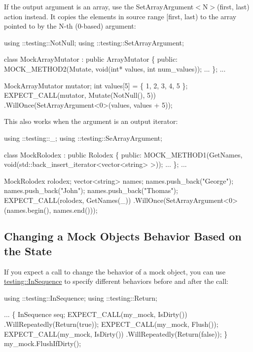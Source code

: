 If the output argument is an array, use the {\ttfamily Set\+Array\+Argument$<$N$>$(first, last)} action instead. It copies the elements in source range {\ttfamily \mbox{[}first, last)} to the array pointed to by the {\ttfamily N}-\/th (0-\/based) argument\+:


\begin{DoxyCode}
using ::testing::NotNull;
using ::testing::SetArrayArgument;

class MockArrayMutator : public ArrayMutator \{
 public:
  MOCK\_METHOD2(Mutate, void(int* values, int num\_values));
  ...
\};
...

  MockArrayMutator mutator;
  int values[5] = \{ 1, 2, 3, 4, 5 \};
  EXPECT\_CALL(mutator, Mutate(NotNull(), 5))
      .WillOnce(SetArrayArgument<0>(values, values + 5));
\end{DoxyCode}


This also works when the argument is an output iterator\+:


\begin{DoxyCode}
using ::testing::\_;
using ::testing::SeArrayArgument;

class MockRolodex : public Rolodex \{
 public:
  MOCK\_METHOD1(GetNames, void(std::back\_insert\_iterator<vector<string> >));
  ...
\};
...

  MockRolodex rolodex;
  vector<string> names;
  names.push\_back("George");
  names.push\_back("John");
  names.push\_back("Thomas");
  EXPECT\_CALL(rolodex, GetNames(\_))
      .WillOnce(SetArrayArgument<0>(names.begin(), names.end()));
\end{DoxyCode}


\subsection*{Changing a Mock Object\textquotesingle{}s Behavior Based on the State}

If you expect a call to change the behavior of a mock object, you can use {\ttfamily \hyperlink{classtesting_1_1InSequence}{testing\+::\+In\+Sequence}} to specify different behaviors before and after the call\+:


\begin{DoxyCode}
using ::testing::InSequence;
using ::testing::Return;

...
  \{
    InSequence seq;
    EXPECT\_CALL(my\_mock, IsDirty())
        .WillRepeatedly(Return(true));
    EXPECT\_CALL(my\_mock, Flush());
    EXPECT\_CALL(my\_mock, IsDirty())
        .WillRepeatedly(Return(false));
  \}
  my\_mock.FlushIfDirty();
\end{DoxyCode}


